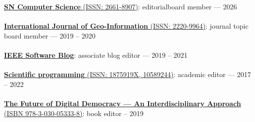 \href{https://link.springer.com/journal/42979/}{\textbf{SN Computer Science} (ISSN: 2661-8907)}: editorialboard member --- 2026
\\ \halfblankline \\
\href{https://www.mdpi.com/journal/ijgi/}{\textbf{International Journal of Geo-Information} (ISSN: 2220-9964)}: journal topic board member --- 2019 -- 2020
\\ \halfblankline \\
\href{http://blog.ieeesoftware.org/}{\textbf{IEEE Software Blog}}: associate blog editor --- 2019 -- 2021
\\ \halfblankline \\
\href{https://www.hindawi.com/journals/sp/}{\textbf{Scientific programming} (ISSN: 1875919X, 10589244)}: academic editor --- 2017 -- 2022
\\ \halfblankline \\
\href{https://www.springer.com/gp/book/9783030053321}{\textbf{The Future of Digital Democracy --- An Interdisciplinary Approach} (ISBN 978-3-030-05333-8)}: book editor -- 2019
